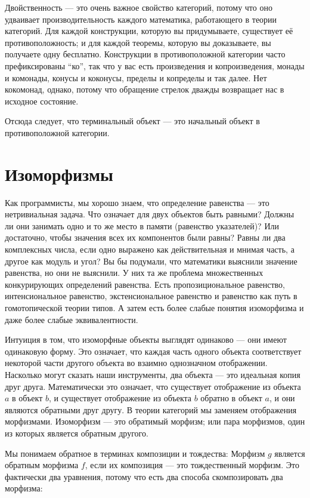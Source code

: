 Двойственность --- это очень важное свойство категорий, потому что оно удваивает
производительность каждого математика, работающего в теории категорий. Для
каждой конструкции, которую вы придумываете, существует её противоположность; и для
каждой теоремы, которую вы доказываете, вы получаете одну бесплатно. Конструкции в
противоположной категории часто префиксированы ``ко'', так что у вас есть произведения
и копроизведения, монады и комонады, конусы и коконусы, пределы и
копределы и так далее. Нет кокомонад, однако, потому что обращение
стрелок дважды возвращает нас в исходное состояние.

Отсюда следует, что терминальный объект --- это начальный объект в
противоположной категории.

\section{Изоморфизмы}

Как программисты, мы хорошо знаем, что определение равенства --- это нетривиальная
задача. Что означает для двух объектов быть равными? Должны ли они
занимать одно и то же место в памяти (равенство указателей)? Или достаточно,
чтобы значения всех их компонентов были равны? Равны ли два комплексных
числа, если одно выражено как действительная и мнимая часть, а
другое как модуль и угол? Вы бы подумали, что математики
выяснили значение равенства, но они не выяснили. У них
та же проблема множественных конкурирующих определений равенства. Есть
пропозициональное равенство, интенсиональное равенство, экстенсиональное
равенство и равенство как путь в гомотопической теории типов. А затем есть
более слабые понятия изоморфизма и даже более слабые эквивалентности.

Интуиция в том, что изоморфные объекты выглядят одинаково --- они имеют
одинаковую форму. Это означает, что каждая часть одного объекта соответствует некоторой
части другого объекта во взаимно однозначном отображении. Насколько могут сказать наши
инструменты, два объекта --- это идеальная копия друг друга.
Математически это означает, что существует отображение из объекта $a$ в
объект $b$, и существует отображение из объекта $b$ обратно в
объект $a$, и они являются обратными друг другу. В теории
категорий мы заменяем отображения морфизмами. Изоморфизм --- это
обратимый морфизм; или пара морфизмов, один из которых является обратным
другого.

Мы понимаем обратное в терминах композиции и тождества: Морфизм
$g$ является обратным морфизма $f$, если их композиция --- это
тождественный морфизм. Это фактически два уравнения, потому что есть
два способа скомпозировать два морфизма:

